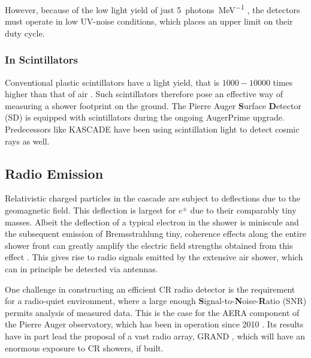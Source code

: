 However, because of the low light yield of just \SI{5}{photons\per\MeV} \cite{nagano2004new}, the detectors must operate in low UV-noise conditions, which 
places an upper limit on their duty cycle.

\subsubsection{In Scintillators}

Conventional plastic scintillators have a light yield, that is $1000-10000$ times higher than that of air \cite{holl1988measurement}. Such scintillators therefore 
pose an effective way of measuring a shower footprint on the ground. The Pierre Auger \textbf{S}urface \textbf{D}etector (SD) is equipped with scintillators during
the ongoing AugerPrime upgrade. Predecessors like KASCADE \cite{Kascade} have been using scintillation light to detect cosmic rays as well.

\subsection{Radio Emission}
\label{ssec:radio-emission}

Relativistic charged particles in the cascade are subject to deflections due to the geomagnetic field. This deflection is largest for $e^\pm$ due to their 
comparably tiny masses. Albeit the deflection of a typical electron in the shower is miniscule and the subsequent emission of Bremsstrahlung tiny, coherence 
effects along the entire shower front can greatly amplify the electric field strengths obtained from this effect \cite{aab2018observation}. This gives rise to radio
signals emitted by the extensive air shower, which can in principle be detected via antennas.

One challenge in constructing an efficient CR radio detector is the requirement for a radio-quiet environment, where a large enough 
\textbf{S}ignal-to-\textbf{N}oise-\textbf{R}atio (SNR) permits analysis of measured data. This is the case for the AERA component of the Pierre Auger observatory,
which has been in operation since 2010 \cite{Aera}. Its results have in part lead the proposal of a vast radio array, GRAND \cite{Grand}, which will have an enormous 
exposure to CR showers, if built.
